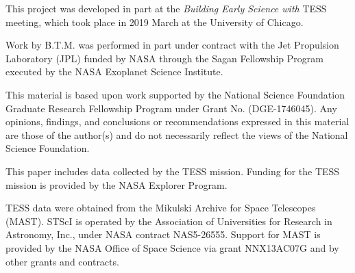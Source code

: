\documentclass[twocolumn]{aastex62}
\begin{document}
This project was developed in part at the \textit{Building Early Science with} TESS meeting, which took place in 2019 March at the University of Chicago.

Work by B.T.M. was performed in part under contract with the Jet
Propulsion Laboratory (JPL) funded by NASA through
the Sagan Fellowship Program executed by the NASA
Exoplanet Science Institute.

This material is based upon work supported by the National Science Foundation Graduate Research Fellowship Program under Grant No. (DGE-1746045). Any opinions, findings, and conclusions or recommendations expressed in this material are those of the author(s) and do not necessarily reflect the views of the National Science Foundation.



This paper includes data collected by the TESS mission. Funding for the TESS mission is provided by the NASA Explorer Program.

TESS data were obtained from the Mikulski Archive for Space Telescopes
(MAST).
STScI is operated by the Association of Universities for Research in
Astronomy, Inc., under NASA contract NAS5-26555.
Support for MAST is provided by the NASA Office of Space Science via grant
NNX13AC07G and by other grants and contracts.










\end{document}
